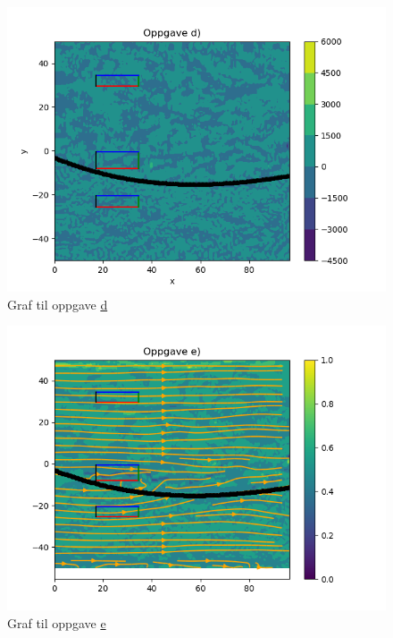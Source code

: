 \documentclass[a4paper,10pt,norsk]{article}
\begin{document}
	\begin{figure}[h!]
		\centering
		\caption{Graf til oppgave \hyperref[ass:d]{d}}
		\label{fig:d}
		\includegraphics{oppgave_d.png}
	\end{figure}
	\begin{figure}[h!]
		\centering
		\caption{Graf til oppgave \hyperref[ass:e]{e}}
		\label{fig:e}
		\includegraphics{oppgave_e.png}
	\end{figure}
\end{document}
